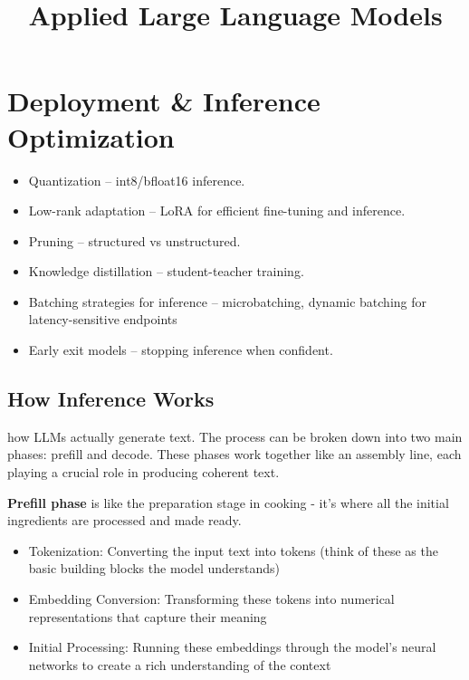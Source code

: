 \documentclass{article}
\begin{document}
\title{Applied Large Language Models}
\maketitle
\section{Deployment \& Inference
Optimization}\label{deployment-inference-optimization}

\begin{itemize}
\item
  Quantization -- int8/bfloat16 inference.
\item
  Low-rank adaptation -- LoRA for efficient fine-tuning and inference.
\item
  Pruning -- structured vs unstructured.
\item
  Knowledge distillation -- student-teacher training.
\item
  Batching strategies for inference -- microbatching, dynamic batching
  for latency-sensitive endpoints
\item
  Early exit models -- stopping inference when confident.
\end{itemize}

\subsection{How Inference Works}\label{how-inference-works}

how LLMs actually generate text. The process can be broken down into two
main phases: prefill and decode. These phases work together like an
assembly line, each playing a crucial role in producing coherent text.

\textbf{Prefill phase} is like the preparation stage in cooking - it's
where all the initial ingredients are processed and made ready.

\begin{itemize}
\item
  Tokenization: Converting the input text into tokens (think of these as
  the basic building blocks the model understands)
\item
  Embedding Conversion: Transforming these tokens into numerical
  representations that capture their meaning
\item
  Initial Processing: Running these embeddings through the model's
  neural networks to create a rich understanding of the context
\end{itemize}
\end{document}
